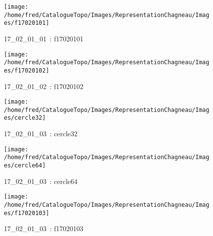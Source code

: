 \documentclass[12pt,titlepage]{book}
\begin{document}
\begin{figure}[h!]
  \hfill         %
  \begin{minipage}[t]{3cm}
    \begin{center}
      \texttt{[image: /home/fred/CatalogueTopo/Images/RepresentationChagneau/Images/f17020101]}
      \caption[~17\_02\_01\_01]{\small{17\_02\_01\_01~:} \tiny{f17020101}}\label{f17020101}
    \end{center}
  \end{minipage}
  \begin{minipage}[t]{3cm}
    \begin{center}
      \texttt{[image: /home/fred/CatalogueTopo/Images/RepresentationChagneau/Images/f17020102]}
      \caption[~17\_02\_01\_02]{\small{17\_02\_01\_02~:} \tiny{f17020102}}\label{f17020102}
    \end{center}
  \end{minipage}
  \begin{minipage}[t]{3cm}
    \begin{center}
      \texttt{[image: /home/fred/CatalogueTopo/Images/RepresentationChagneau/Images/cercle32]}
      \caption[~17\_02\_01\_03]{\small{17\_02\_01\_03~:} \tiny{cercle32}}\label{cercle32}
    \end{center}
  \end{minipage}
  \begin{minipage}[t]{3cm}
    \begin{center}
      \texttt{[image: /home/fred/CatalogueTopo/Images/RepresentationChagneau/Images/cercle64]}
      \caption[~17\_02\_01\_03]{\small{17\_02\_01\_03~:} \tiny{cercle64}}\label{cercle64}
    \end{center}
  \end{minipage}
  \begin{minipage}[t]{3cm}
    \begin{center}
      \texttt{[image: /home/fred/CatalogueTopo/Images/RepresentationChagneau/Images/f17020103]}
      \caption[~17\_02\_01\_03]{\small{17\_02\_01\_03~:} \tiny{f17020103}}\label{f17020103}
    \end{center}
  \end{minipage}
  \begin{minipage}[t]{3cm}
    \begin{center}

\end{center}
\end{minipage}
\end{figure}
\end{document}
